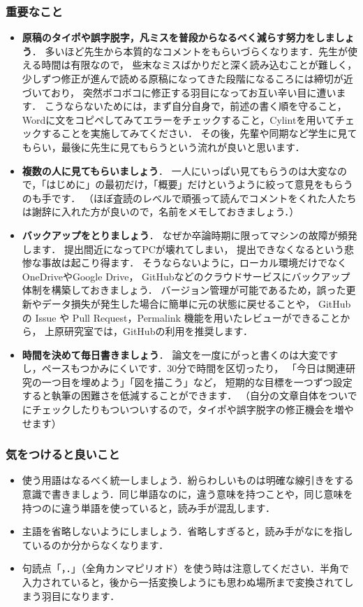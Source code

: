 \subsubsection{重要なこと}
\begin{itemize}
    \item \textbf{原稿のタイポや誤字脱字，凡ミスを普段からなるべく減らす努力をしましょう}．
    多いほど先生から本質的なコメントをもらいづらくなります．先生が使える時間は有限なので，
    些末なミスばかりだと深く読み込むことが難しく，少しずつ修正が進んで読める原稿になってきた段階になるころには締切が近づいており，
    突然ボコボコに修正する羽目になってお互い辛い目に遭います．
    こうならないためには，まず自分自身で，前述の書く順を守ること，Wordに文をコピペしてみてエラーをチェックすること，Cylint\cite{cylint}を用いてチェックすることを実施してみてください．
    その後，先輩や同期など学生に見てもらい，最後に先生に見てもらうという流れが良いと思います．
    \item \textbf{複数の人に見てもらいましょう}．
    一人にいっぱい見てもらうのは大変なので，「はじめに」の最初だけ，「概要」だけというように絞って意見をもらうのも手です．
    （ほぼ査読のレベルで頑張って読んでコメントをくれた人たちは謝辞に入れた方が良いので，名前をメモしておきましょう．）
    \item \textbf{バックアップをとりましょう}．
    なぜか卒論時期に限ってマシンの故障が頻発します． 提出間近になってPCが壊れてしまい，
    提出できなくなるという悲惨な事故は起こり得ます． そうならないように，ローカル環境だけでなくOneDriveやGoogle Drive，
    GitHubなどのクラウドサービスにバックアップ体制を構築しておきましょう．
    バージョン管理が可能であるため，誤った更新やデータ損失が発生した場合に簡単に元の状態に戻せることや，
    GitHub の Issue や Pull Request，Permalink 機能を用いたレビューができることから，
    上原研究室では，GitHubの利用を推奨します\cite{cytex}．
    \item \textbf{時間を決めて毎日書きましょう}．
    論文を一度にがっと書くのは大変ですし，ペースもつかみにくいです．30分で時間を区切ったり，
    「今日は関連研究の一つ目を埋めよう」「図を描こう」など，
    短期的な目標を一つずつ設定すると執筆の困難さを低減することができます．
    （自分の文章自体をついでにチェックしたりもついついするので，タイポや誤字脱字の修正機会を増やせます）
\end{itemize}

\subsubsection{気をつけると良いこと}
\begin{itemize}
    \item 使う用語はなるべく統一しましょう．紛らわしいものは明確な線引きをする意識で書きましょう．同じ単語なのに，違う意味を持つことや，同じ意味を持つのに違う単語を使っていると，読み手が混乱します．
    \item 主語を省略しないようにしましょう．省略しすぎると，読み手がなにを指しているのか分からなくなります．
    \item 句読点「，．」（全角カンマピリオド）を使う時は注意してください．半角で入力されていると，後から一括変換しようにも思わぬ場所まで変換されてしまう羽目になります．
\end{itemize}

